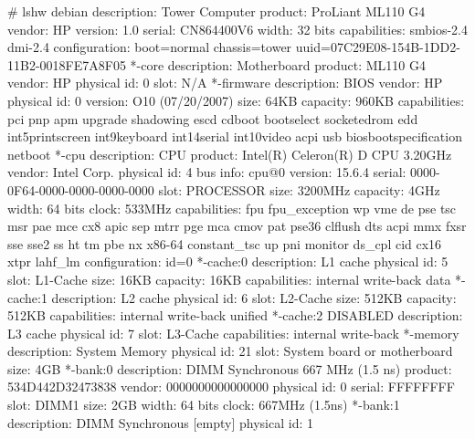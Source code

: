\documentclass[mingoth,a4paper]{jsarticle}
\begin{document}
{{{{{{{{{{{\begin{commandline}
# lshw 
debian
    description: Tower Computer
    product: ProLiant ML110 G4
    vendor: HP
    version: 1.0
    serial: CN864400V6
    width: 32 bits
    capabilities: smbios-2.4 dmi-2.4
    configuration: boot=normal chassis=tower uuid=07C29E08-154B-1DD2-11B2-0018FE7A8F05
  *-core
       description: Motherboard
       product: ML110 G4
       vendor: HP
       physical id: 0
       slot: N/A
     *-firmware
          description: BIOS
          vendor: HP
          physical id: 0
          version: O10 (07/20/2007)
          size: 64KB
          capacity: 960KB
          capabilities: pci pnp apm upgrade shadowing escd cdboot bootselect socketedrom edd int5printscreen int9keyboard int14serial int10video acpi usb biosbootspecification netboot
     *-cpu
          description: CPU
          product: Intel(R) Celeron(R) D CPU 3.20GHz
          vendor: Intel Corp.
          physical id: 4
          bus info: cpu@0
          version: 15.6.4
          serial: 0000-0F64-0000-0000-0000-0000
          slot: PROCESSOR
          size: 3200MHz
          capacity: 4GHz
          width: 64 bits
          clock: 533MHz
          capabilities: fpu fpu_exception wp vme de pse tsc msr pae mce cx8 apic sep mtrr pge mca cmov pat pse36 clflush dts acpi mmx fxsr sse sse2 ss ht tm pbe nx x86-64 constant_tsc up pni monitor ds_cpl cid cx16 xtpr lahf_lm
          configuration: id=0
        *-cache:0
             description: L1 cache
             physical id: 5
             slot: L1-Cache
             size: 16KB
             capacity: 16KB
             capabilities: internal write-back data
        *-cache:1
             description: L2 cache
             physical id: 6
             slot: L2-Cache
             size: 512KB
             capacity: 512KB
             capabilities: internal write-back unified
        *-cache:2 DISABLED
             description: L3 cache
             physical id: 7
             slot: L3-Cache
             capabilities: internal write-back
     *-memory
          description: System Memory
          physical id: 21
          slot: System board or motherboard
          size: 4GB
        *-bank:0
             description: DIMM Synchronous 667 MHz (1.5 ns)
             product: 534D442D32473838
             vendor: 0000000000000000
             physical id: 0
             serial: FFFFFFFF
             slot: DIMM1
             size: 2GB
             width: 64 bits
             clock: 667MHz (1.5ns)
        *-bank:1
             description: DIMM Synchronous [empty]
             physical id: 1

\end{commandline}}}}}}}}}}}}
\end{document}
